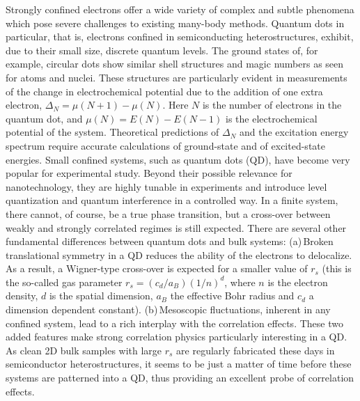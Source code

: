 \documentclass[twocolumn]{revtex4}
\begin{document}
Strongly confined electrons
offer a wide variety of complex and subtle phenomena which pose severe 
challenges to existing many-body methods.
Quantum dots in particular, that is, electrons confined in semiconducting heterostructures,
exhibit, due to their small size, discrete quantum levels. 
The ground states of, for example, circular dots
show similar shell structures and magic numbers 
as seen for atoms and nuclei. These structures are particularly evident in
measurements of the change in electrochemical potential due to the addition of
one extra electron, 
$\Delta_N=\mu(N+1)-\mu(N)$. Here $N$ is the number of electrons in the quantum dot, and
$\mu(N)=E(N)-E(N-1)$ is the electrochemical potential of the system.
Theoretical predictions of $\Delta_N$ and the excitation energy spectrum require
accurate calculations of ground-state and of excited-state energies.
Small confined systems, such as quantum dots (QD), have become very popular for experimental 
study. Beyond their possible relevance for nanotechnology, they are highly tunable 
in experiments and introduce level quantization and quantum interference in a controlled way. In a finite system, 
there cannot, of course, be a true phase transition, but a cross-over between weakly and strongly correlated regimes is 
still expected. There are several other fundamental differences between quantum dots and bulk systems: (a)\,Broken translational 
symmetry in a QD reduces the ability of the electrons to delocalize. As a result, a Wigner-type cross-over 
is expected for a smaller value of $r_s$ (this is the so-called gas parameter $r_s=(c_d/a_B)(1/n)^d$, where $n$ is the electron density, $d$ is the spatial dimension, $a_B$ the effective Bohr radius and  $c_d$ a dimension dependent constant). (b)\,Mesoscopic fluctuations, inherent in any confined system, 
lead to a rich interplay with the correlation effects. These two added features make strong correlation physics particularly 
interesting in a QD. As clean 2D bulk samples with large $r_s$ are regularly fabricated these days in semiconductor 
heterostructures, it seems to be just a matter of time before these systems are patterned into a QD, 
thus providing an excellent probe of correlation effects.
\end{document}
